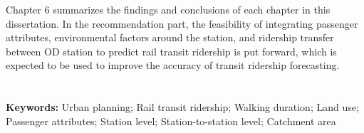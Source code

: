 \documentclass[12pt, twoside, a4paper]{book} %
\begin{document}
Chapter 6 summarizes the findings and conclusions of each chapter in this dissertation. In the recommendation part, the feasibility of integrating passenger attributes, environmental factors around the station, and ridership transfer between OD station to predict rail transit ridership is put forward, which is expected to be used to improve the accuracy of transit ridership forecasting.
 \\ \\ \\

\noindent %
\textbf{Keywords:} Urban planning; Rail transit ridership; Walking duration; Land use; Passenger attributes; Station level; Station-to-station level; Catchment area

\mainmatter %













% 
% 

\backmatter
% 
% 
% 
\end{document}
